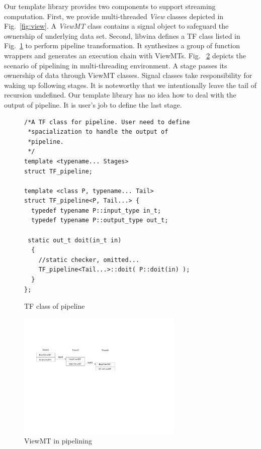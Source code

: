 \documentclass[10pt, conference, compsocconf]{IEEEtran}
\begin{document}
Our template library provides two components to support streaming
computation. First, we provide  multi-threaded \emph{View}
classes depicted in Fig.~\ref{fig:view}. A \emph{ViewMT} class
contains a signal object to safeguard the ownership of underlying data
set. Second, libvina
defines a TF class listed in Fig.~\ref{lst:pipe} to perform
pipeline transformation. It synthesizes a group of function wrappers
and generates an execution chain with ViewMTs.  Fig. ~\ref{fig:viewmt}
depicts the scenario of pipelining in multi-threading environment. A
stage passes its ownership of data through ViewMT classes. Signal
classes take responsibility for waking up following stages.  It is noteworthy
that we intentionally leave the tail of recursion undefined. Our
template library has no idea how to deal with the output of pipeline. It is user's job
to define the last stage.

\begin{figure}[!htp]
\begin{minipage}[tb]{\linewidth}
\makebox[\textwidth]{\hrulefill}
\begin{small}
\begin{verbatim}
/*A TF class for pipeline. User need to define 
 *spacialization to handle the output of 
 *pipeline.
 */
template <typename... Stages>
struct TF_pipeline;

template <class P, typename... Tail>
struct TF_pipeline<P, Tail...> {
  typedef typename P::input_type in_t;
  typedef typename P::output_type out_t;
 
 static out_t doit(in_t in)
  {
    //static checker, omitted...
    TF_pipeline<Tail...>::doit( P::doit(in) );
  }
};  
\end{verbatim}
\end{small}
\vspace{-1ex}\makebox[\textwidth]{\hrulefill}
\end{minipage}
\caption{TF class of pipeline}\label{lst:pipe}
\end{figure}

\begin{figure}[htp]
\includegraphics[width=3.1in]{viewmt}
\caption{ViewMT in pipelining}\label{fig:viewmt}
\end{figure}
\end{document}
